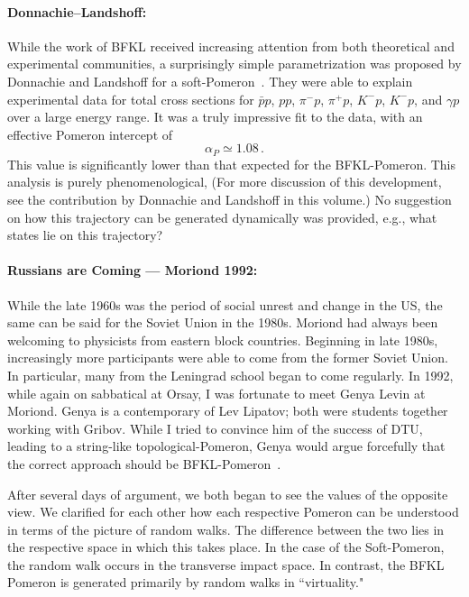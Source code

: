\documentclass[11pt, oneside]{article}   	%
\newcommand{\<}{\langle}
\renewcommand{\>}{\rangle}
\numberwithin{equation}{section}
\numberwithin{figure}{section}
\begin{document}
\paragraph{Donnachie--Landshoff:}
While the work of BFKL received  increasing   attention from  both theoretical and experimental communities, a surprisingly simple parametrization was proposed by Donnachie and Landshoff for a soft-Pomeron~\cite{D-L}.  They were able to explain experimental data for total cross sections for $\bar pp$, $pp$, $\pi^-p$, $\pi^+p$, $K^-p$, $K^-p$, and $\gamma p$ over a large energy range. It was a truly impressive fit to the data, with an effective Pomeron intercept of
$$
\alpha_P\simeq 1.08 \,.
$$
This value is significantly lower than that expected for the BFKL-Pomeron. This analysis is purely phenomenological, (For more discussion of this development, see the contribution by Donnachie and Landshoff in this volume.)   No suggestion  on how this trajectory can be generated dynamically was provided,  e.g., what states lie  on this trajectory?    




\paragraph{Russians are Coming --- Moriond 1992:}
While the late 1960s was the period of social unrest and change in the US, the same can be said for the Soviet Union in the 1980s.  Moriond had always been welcoming to physicists  from eastern block  countries. Beginning in late 1980s, increasingly more participants were able to come from the former Soviet Union. In particular, many from the Leningrad school began to come regularly. In 1992, while again on sabbatical at Orsay, I was fortunate to meet Genya Levin at Moriond. 
Genya is a contemporary of Lev Lipatov; both were students together working with Gribov. While I tried to convince him of the success of DTU, leading to a string-like topological-Pomeron, Genya would argue forcefully that the correct approach should be BFKL-Pomeron~\cite{Levin:1976mc}. 

After several days of argument, we both began to see  the values of the opposite view.  We clarified for each other how each respective Pomeron can be understood in terms of the picture of random walks. The difference between the two lies in the respective space in which this takes place. In the case of the Soft-Pomeron, the random walk occurs in the transverse impact space. In contrast, the BFKL Pomeron is generated primarily by random walks in ``virtuality."
\end{document}
